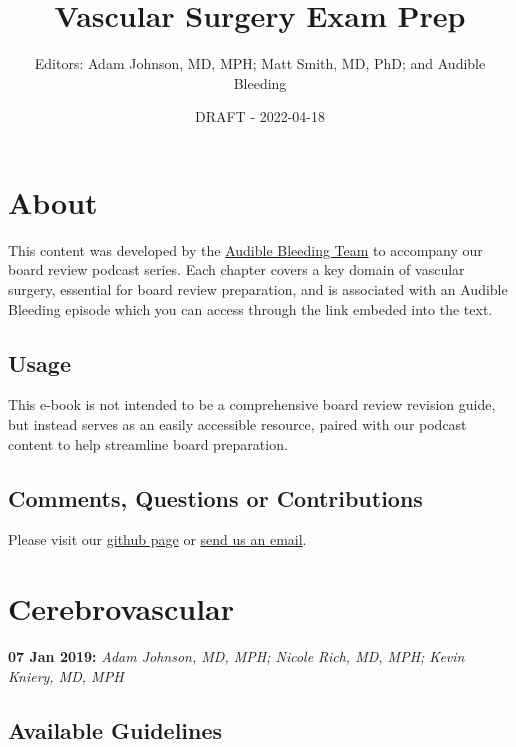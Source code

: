 \documentclass[
]{book}
\title{Vascular Surgery Exam Prep}
\author{Editors: Adam Johnson, MD, MPH; Matt Smith, MD, PhD; and Audible Bleeding}
\date{DRAFT - 2022-04-18}
\begin{document}
\maketitle

{
\setcounter{tocdepth}{1}
\tableofcontents
}
\hypertarget{about}{%
\chapter{About}\label{about}}

This content was developed by the \href{https://www.audiblebleeding.com/about-1/}{Audible Bleeding Team} to accompany our board review podcast series.
Each chapter covers a key domain of vascular surgery, essential for board review preparation, and is associated with an Audible Bleeding episode which you can access through the link embeded into the text.

\hypertarget{usage}{%
\section{Usage}\label{usage}}

This e-book is not intended to be a comprehensive board review revision guide, but instead serves as an easily accessible resource, paired with our podcast content to help streamline board preparation.

\hypertarget{comments-questions-or-contributions}{%
\section{Comments, Questions or Contributions}\label{comments-questions-or-contributions}}

Please visit our \href{https://github.com/adam-mdmph/VS-Board-Review}{github page} or \href{mailto:audiblebleeding@vascularsociety.org}{send us an email}.

\hypertarget{cerebrovascular}{%
\chapter{Cerebrovascular}\label{cerebrovascular}}

\textbf{07 Jan 2019:} \emph{Adam Johnson, MD, MPH; Nicole Rich, MD, MPH; Kevin
Kniery, MD, MPH}

\hypertarget{available-guidelines}{%
\section{Available Guidelines}\label{available-guidelines}}
\end{document}
